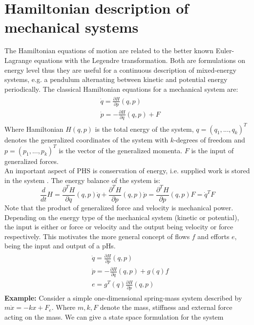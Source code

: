\documentclass[a4paper,twoside, openright,12pt]{report}
\begin{document}
\section{Hamiltonian description of mechanical systems}\label{SS:HSdescription}
The Hamiltonian equations of motion are related to the better known Euler-Lagrange equations with the Legendre transformation. Both are formulations on energy level thus they are useful for a continuous description of mixed-energy systems, e.g. a pendulum alternating between kinetic and potential energy periodically.
The classical Hamiltonian equations for a mechanical system are:
\begin{eqnarray}\label{EQ:generalPHS}
	\begin{aligned}
	& \dot{q} = \frac{\partial H}{\partial p}(q,p)\\
	& \dot{p} = -\frac{\partial H}{\partial q}(q,p) + F
	\end{aligned}
\end{eqnarray}
Where Hamiltonian $ H(q,p) $ is the total energy of the system, $ q = (q_1,...,q_k)^T $ denotes the generalized coordinates of the system with $ k $-degrees of freedom and $ p = (p_1,...,p_k)^T $ is the vector of the generalized momenta. $ F $ is the input of generalized forces.\\
An important aspect of PHS is conservation of energy, i.e. supplied work is stored in the system \cite{vanderSchaft_06}. The energy balance of the system is:
\begin{equation}
	\frac{d}{dt}H = \frac{\partial^T H}{\partial q}(q,p)\dot{q} + \frac{\partial^T H}{\partial p}(q,p)\dot{p} = \frac{\partial^T H}{\partial p}(q,p)F = \dot{q}^T F
\end{equation}
Note that the product of generalized force and velocity is mechanical power. Depending on the energy type of the mechanical system (kinetic or potential), the input is either or force or velocity and the output being  velocity or force respectively. This motivates the more general concept of flows $f$ and efforts $e$, being the input and output of a pHs.
\begin{eqnarray}
\begin{aligned}
	& \dot{q} = \frac{\partial H}{\partial p}(q,p)\\
	& \dot{p} = -\frac{\partial H}{\partial q}(q,p)+g(q)f \\   &e = g^T(q)\frac{\partial H}{\partial p}(q,p)
\end{aligned}	
\end{eqnarray}
\textbf{Example:} Consider a simple one-dimensional spring-mass system described by $ m\ddot{x} = -kx +F_e $. Where $ m,k,F $ denote the mass, stiffness and external force acting on the mass. We can give a state space formulation for the system
\end{document}
